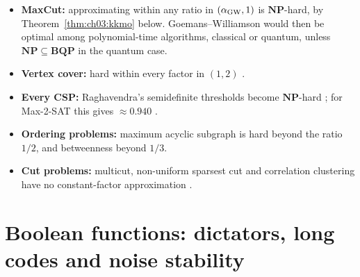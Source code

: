 \documentclass[handoutsbeamer.tex]{subfiles}
\begin{document}
\begin{frame}
\begin{itemize}\setlength\itemsep{0.25em}
    \item \textbf{MaxCut:} approximating within any ratio in $(\alpha_{\rm GW},1)$ is $\mathbf{NP}$-hard, by Theorem~\ref{thm:ch03:kkmo} below. Goemans--Williamson would then be optimal among polynomial-time algorithms, classical or quantum, unless $\mathbf{NP}\subseteq\mathbf{BQP}$ in the quantum case.
    \item \textbf{Vertex cover:} hard within every factor in $(1,2)$ \citep{khot2008vertex}.
    \item \textbf{Every CSP:} Raghavendra's semidefinite thresholds become $\mathbf{NP}$-hard \citep{raghavendra2008optimal}; for Max-2-SAT this gives $\approx0.940$ \citep{austrin2007balanced,brakensiek2024tight}.
    \item \textbf{Ordering problems:} maximum acyclic subgraph is hard beyond the ratio $1/2$, and betweenness beyond $1/3$.
    \item \textbf{Cut problems:} multicut, non-uniform sparsest cut and correlation clustering have no constant-factor approximation \citep{khot2015unique}.
\end{itemize}
\end{frame}

\section{Boolean functions: dictators, long codes and noise stability}
\end{document}
